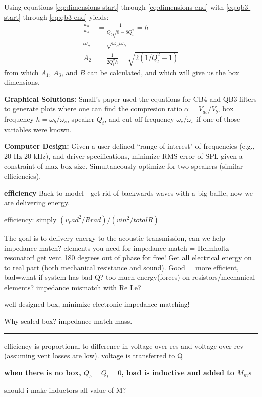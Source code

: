 \documentclass[10pt,letterpaper]{book}
\begin{document}
Using equations \ref{eq:dimensions-start} through \ref{eq:dimensions-end} with \ref{eq:qb3-start} through \ref{eq:qb3-end} yields:
\begin{align}
\frac{w_b}{w_s}&= \frac{1}{Q_t\sqrt{8-8Q_t^2}}=h\\
\omega_c&=\sqrt{\omega_s \omega_b}\\
A_2&=\frac{1}{2 Q_t^2 h}=\sqrt{2(1/Q_t^2-1)}
\end{align}
from which $A_1$, $A_3$, and $B$ can be calculated, and which will give us the box dimensions.

\textbf{Graphical Solutions:} Small's paper used the equations for CB4 and QB3 filters to generate plots where one can find the compresion ratio $\alpha=V_{as}/V_{b}$, box frequency $h=\omega_b/\omega_s$, speaker $Q_t$, and cut-off frequency $\omega_c/\omega_s$ if one of those variables were known.



\textbf{Computer Design:} Given a user defined ``range of interest" of frequencies (e.g., 20 Hz-20 kHz), and driver specifications, minimize RMS error of SPL given a constraint of max box size. Simultaneously optimize for two speakers (similar efficiencies).




\textbf{efficiency}
Back to model - get rid of backwards waves with a big baffle, now we are delivering energy.

efficiency: simply $(v_rad^2/Rrad) / (vin^2/totalR)$

The goal is to delivery energy to the acoustic transmission, can we help impedance match? elements you need for impedance match = Helmholtz resonator! get vent 180 degrees out of phase for free! Get all electrical energy on to real part (both mechanical resistance and sound). Good = more efficient, bad=what if system has bad Q? too much energy(forces) on resistors/mechanical elements? impedance mismatch with Re Le?

well designed box, minimize electronic impedance matching!

Why sealed box? impedance match mass.


\hrule

efficiency is proportional to difference in voltage over res and voltage over rev (assuming vent losses are low). voltage is transferred to Q

\textbf{when there is no box, $Q_b=Q_l=0$, load is inductive and added to $M_ms$}

should i make inductors all value of M?
\end{document}
